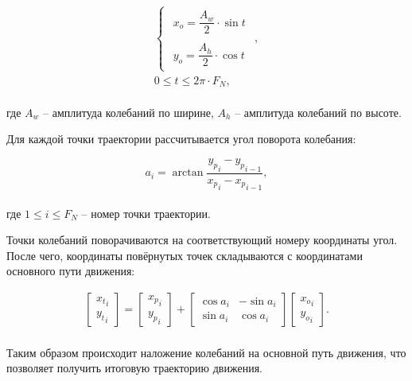 \begin{gather}
    \begin{cases}
        \label{eq:OscillationCircle}
        \begin{aligned}
            x_o = \dfrac{A_w}{2} \cdot \sin t \\
            \\
            y_o = \dfrac{A_h}{2} \cdot \cos t
        \end{aligned}
    \end{cases}, \\
    \nonumber
    0 \leq t \leq 2 \pi \cdot F_N,
\end{gather} \\
где $A_w$ -- амплитуда колебаний по ширине, $A_h$ -- амплитуда колебаний по высоте.

Для каждой точки траектории рассчитывается угол поворота колебания:

\begin{equation*}
    a_i = \arctan \dfrac{{y_p}_i - {y_p}_{i-1}}{{x_p}_i - {x_p}_{i-1}},
\end{equation*} \\
где $1 \leq i \leq F_N$ -- номер точки траектории.

Точки колебаний поворачиваются на соответствующий номеру координаты угол.
После чего, координаты повёрнутых точек складываются с координатами основного пути движения:

\begin{gather*}
    \begin{bmatrix}
    {x_t}
        _i \\
        {y_t}_i
    \end{bmatrix} =
    \begin{bmatrix}
    {x_p}
        _i \\
        {y_p}_i
    \end{bmatrix} +
    \begin{bmatrix}
        \cos a_i & - \sin a_i \\
        \sin a_i & \cos a_i
    \end{bmatrix}
    \begin{bmatrix}
    {x_o}
        _i \\
        {y_o}_i
    \end{bmatrix}.
\end{gather*} \\

Таким образом происходит наложение колебаний на основной путь движения, что позволяет получить итоговую траекторию движения.

